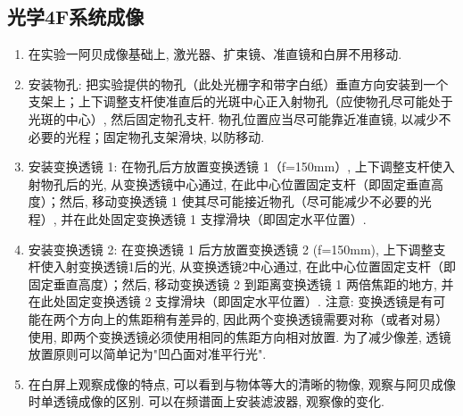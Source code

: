 \documentclass[zihao=5, UTF8]{article}
\theoremstyle{MyLineTheoremStyle} %
\theoremstyle{MyBlockTheoremStyle} %
\theoremstyle{MySubsubsectionStyle} %
\begin{document}
\subsection{光学4F系统成像}
\begin{enumerate}
    \item 在实验一阿贝成像基础上, 激光器、扩束镜、准直镜和白屏不用移动. 
    \item 安装物孔: 把实验提供的物孔（此处光栅字和带字白纸）垂直方向安装到一个支架上；上下调整支杆使准直后的光斑中心正入射物孔（应使物孔尽可能处于光斑的中心）, 然后固定物孔支杆. 物孔位置应当尽可能靠近准直镜, 以减少不必要的光程；固定物孔支架滑块, 以防移动. 
    \item 安装变换透镜 1: 在物孔后方放置变换透镜 1（f=150mm）, 上下调整支杆使入射物孔后的光, 从变换透镜中心通过, 在此中心位置固定支杆（即固定垂直高度）；然后, 移动变换透镜 1 使其尽可能接近物孔（尽可能减少不必要的光程）, 并在此处固定变换透镜 1 支撑滑块（即固定水平位置）. 
    \item 安装变换透镜 2: 在变换透镜 1 后方放置变换透镜 2 (f=150mm), 上下调整支杆使入射变换透镜1后的光, 从变换透镜2中心通过, 在此中心位置固定支杆（即固定垂直高度）；然后, 移动变换透镜 2 到距离变换透镜 1 两倍焦距的地方, 并在此处固定变换透镜 2 支撑滑块（即固定水平位置）. 注意: 变换透镜是有可能在两个方向上的焦距稍有差异的, 因此两个变换透镜需要对称（或者对易）使用, 即两个变换透镜必须使用相同的焦距方向相对放置. 为了减少像差, 透镜放置原则可以简单记为"凹凸面对准平行光". 
    \item 在白屏上观察成像的特点, 可以看到与物体等大的清晰的物像, 观察与阿贝成像时单透镜成像的区别. 可以在频谱面上安装滤波器, 观察像的变化. 
\end{enumerate}
\end{document}

